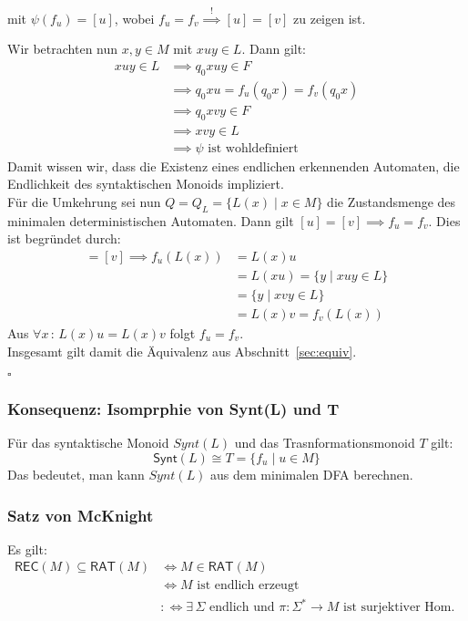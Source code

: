 \documentclass[12pt, german]{article}
\newcommand{\sigstern}{\Sigma^\ast}
\newcommand{\rat}{\mathsf{RAT}}
\newcommand{\rec}{\mathsf{REC}}
\newcommand{\synt}{\mathsf{Synt}}
\newcommand{\bewiesen}{
	
	\begin{flushright}
		$\square$  \\
\end{flushright}}
\begin{document}
	mit $\psi(f_u)=[u]$, wobei $f_u = f_v \overset{!}{\implies} [u] = [v]$ zu zeigen ist. 
	
	Wir betrachten nun $x, y \in M$ mit $xuy \in L$.
	Dann gilt:
	\begin{align*}
		xuy \in L &\implies q_0xuy \in F\\
		&\implies q_0xu = f_u(q_0x) = f_v(q_0x)\\
		&\implies q_0xvy \in F \\
		&\implies xvy \in L\\
		&\implies \psi \text{ ist wohldefiniert}
	\end{align*}
	Damit wissen wir, dass die Existenz eines endlichen erkennenden Automaten, die Endlichkeit des syntaktischen Monoids impliziert.\\
	
	Für die Umkehrung sei nun $Q = Q_L = \{L(x) \mid x \in M\}$ die Zustandsmenge des minimalen deterministischen Automaten. Dann gilt $[u]= [v] \implies f_u = f_v$. Dies ist begründet durch:
	\begin{align*}
		[u]= [ v ] \implies f_u(L(x)) &= L(x)u \\
		&= L(xu) = \{y \mid xuy \in L\} \\ 
		&= \{y \mid xvy \in L\} \\
		&= L(x)v = f_v(L(x))
	\end{align*}
	Aus $\forall x\, :\, L(x)u = L(x)v$ folgt $f_u = f_v$.\\
	Insgesamt gilt damit die Äquivalenz aus Abschnitt~\ref{sec:equiv}. 
	\bewiesen
	
	\subsubsection{Konsequenz: Isomprphie von Synt(L) und T}
	Für das syntaktische Monoid $Synt(L)$ und das Trasnformationsmonoid $T$ gilt:
	$$\synt(L) \cong T = \{f_u \mid u \in M\}$$
	Das bedeutet, man kann $Synt(L)$ aus dem minimalen DFA berechnen.
	
	\subsubsection{Satz von McKnight}
	Es gilt: 
	\begin{align*}
		\rec(M) \subseteq \rat(M) &\iff M \in \rat(M)\\ 
		&\iff M \text{ ist endlich erzeugt} \\ 
		&:\iff \exists \, \Sigma \text{ endlich und } \pi : \sigstern \to M \text{ ist surjektiver Hom. }
	\end{align*}
	
\end{document}
